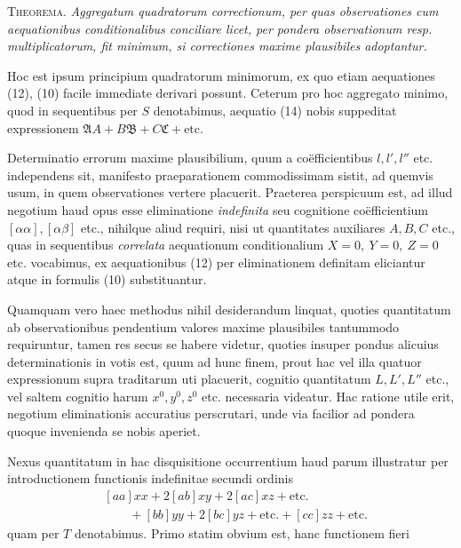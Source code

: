 \textsc{Theorema.} \textit{Aggregatum quadratorum correctionum, per quas observationes cum aequationibus conditionalibus conciliare licet, per pondera observationum resp. multiplicatorum, fit minimum, si correctiones maxime plausibiles adoptantur.}

Hoc est ipsum principium quadratorum minimorum, ex quo etiam aequationes (12), (10) facile immediate derivari possunt. Ceterum pro hoc aggregato minimo, quod in sequentibus per \(S\) denotabimus, aequatio (14) nobis suppeditat expressionem \(\mathfrak A A+B\mathfrak B+C\mathfrak C+\text{etc.}\)

Determinatio errorum maxime plausibilium, quum a coëfficientibus \(l,l',l''\) etc. independens sit, manifesto praeparationem commodissimam sistit, ad quemvis usum, in quem observationes vertere placuerit. Praeterea perspicuum est, ad illud negotium haud opus esse eliminatione \textit{indefinita} seu cognitione coëfficientium \([\alpha\alpha],[\alpha\beta]\) etc., nihilque aliud requiri, nisi ut quantitates auxiliares \(A,B,C\) etc., quas in sequentibus \textit{correlata} aequationum conditionalium \(X=0,\ Y=0,\ Z=0\) etc. vocabimus, ex aequationibus (12) per eliminationem definitam eliciantur atque in formulis (10) substituantur.

Quamquam vero haec methodus nihil desiderandum linquat, quoties quantitatum ab observationibus pendentium valores maxime plausibiles tantummodo requiruntur, tamen res secus se habere videtur, quoties insuper pondus alicuius determinationis in votis est, quum ad hunc finem, prout hac vel illa quatuor expressionum supra traditarum uti placuerit, cognitio quantitatum \(L,L',L''\) etc., vel saltem cognitio harum \(x^0,y^0,z^0\) etc. necessaria videatur. Hac ratione utile erit, negotium eliminationis accuratius perscrutari, unde via facilior ad pondera quoque invenienda se nobis aperiet.

Nexus quantitatum in hac disquisitione occurrentium haud parum illustratur per introductionem functionis indefinitae secundi ordinis
\[
\begin{aligned}&[aa]xx+2[ab]xy+2[ac]xz+\text{etc.}\\&\qquad+[bb]yy+2[bc]yz+\text{etc.}+[cc]zz+\text{etc.}\end{aligned}
\]
quam per \(T\) denotabimus. Primo statim obvium est, hanc functionem fieri

